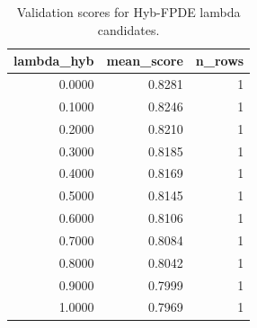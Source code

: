 \begin{table}[t]
\caption{Validation scores for Hyb-FPDE lambda candidates.}
\label{tab:lambda_distribution_computed}
\centering
\begin{tabular}{rrr}
\toprule
lambda\_hyb & mean\_score & n\_rows \\
\midrule
0.0000 & 0.8281 & 1 \\
0.1000 & 0.8246 & 1 \\
0.2000 & 0.8210 & 1 \\
0.3000 & 0.8185 & 1 \\
0.4000 & 0.8169 & 1 \\
0.5000 & 0.8145 & 1 \\
0.6000 & 0.8106 & 1 \\
0.7000 & 0.8084 & 1 \\
0.8000 & 0.8042 & 1 \\
0.9000 & 0.7999 & 1 \\
1.0000 & 0.7969 & 1 \\
\bottomrule
\end{tabular}

\end{table}
